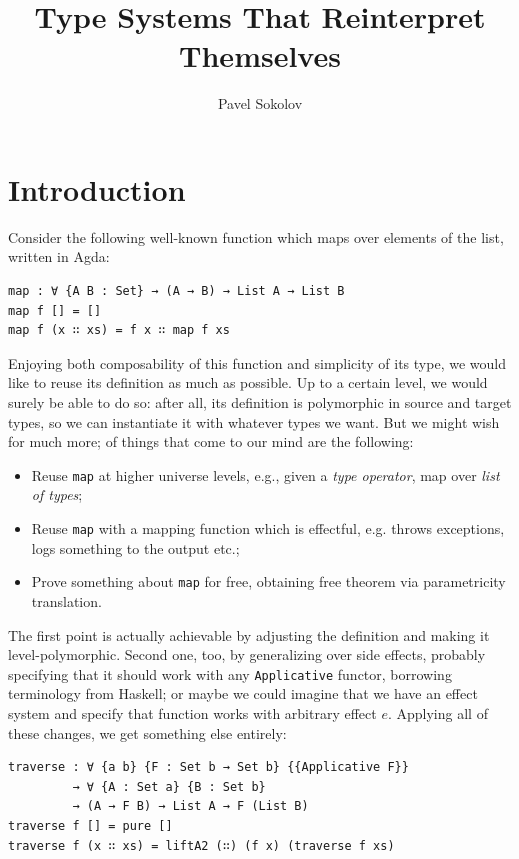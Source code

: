 \documentclass[acmsmall, review, screen, authorversion]{acmart}
\title{Type Systems That Reinterpret Themselves}
\author{Pavel Sokolov}
\begin{document}
\maketitle

\section{Introduction}

Consider the following well-known function which maps over elements
of the list, written in Agda:

\begin{verbatim}
map : ∀ {A B : Set} → (A → B) → List A → List B
map f [] = []
map f (x ∷ xs) = f x ∷ map f xs
\end{verbatim}

Enjoying both composability of this function and simplicity of its
type, we would like to reuse its definition as much as possible. Up
to a certain level, we would surely be able to do so: after all, its
definition is polymorphic in source and target types, so we can
instantiate it with whatever types we want. But we might wish for
much more; of things that come to our mind are the following:

\begin{itemize}
    \item Reuse \texttt{map} at higher universe levels, e.g., given a
        \textit{type operator}, map over \textit{list of types};
    \item Reuse \texttt{map} with a mapping function which is
        effectful, e.g. throws exceptions, logs something to the
        output etc.;
    \item Prove something about \texttt{map} for free, obtaining free
        theorem via parametricity translation.
\end{itemize}

The first point is actually achievable by adjusting the definition
and making it level-polymorphic. Second one, too, by generalizing
over side effects, probably specifying that it should work with any
\texttt{Applicative} functor, borrowing terminology from Haskell; or
maybe we could imagine that we have an effect system and specify that
function works with arbitrary effect $e$. Applying all of these
changes, we get something else entirely:

\begin{verbatim}
traverse : ∀ {a b} {F : Set b → Set b} {{Applicative F}}
         → ∀ {A : Set a} {B : Set b}
         → (A → F B) → List A → F (List B)
traverse f [] = pure []
traverse f (x ∷ xs) = liftA2 (∷) (f x) (traverse f xs)
\end{verbatim}
\end{document}

